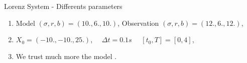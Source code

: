 	\begin{frame}[allowframebreaks]{Lorenz System - Differents parameters}
       
       \begin{enumerate}[\textbullet]
           \item Model $(\sigma, r, b)=(10.,6.,10.)$, Observation $(\sigma, r, b)=(12.,6.,12.)$,
           \item $X_0=(-10.,-10.,25.)$, $\quad \Delta t=0.1s$ $\quad [t_0,T]=[0,4]$,
           \item We trust much more the model .
           \end{enumerate}
   
       \begin{figure}
           \centering
       \end{figure}
   
       \newpage
    

\end{frame}

